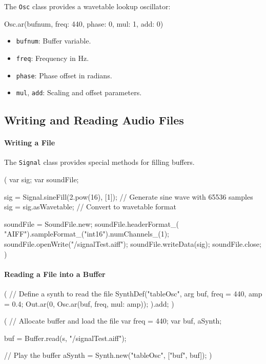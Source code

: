 The \texttt{Osc} class provides a wavetable lookup oscillator:

\begin{supercollider*}
Osc.ar(bufnum, freq: 440, phase: 0, mul: 1, add: 0)
\end{supercollider*}

\begin{itemize}
    \item \texttt{bufnum}: Buffer variable.
    \item \texttt{freq}: Frequency in Hz.
    \item \texttt{phase}: Phase offset in radians.
    \item \texttt{mul}, \texttt{add}: Scaling and offset parameters.
\end{itemize}

\subsection{Writing and Reading Audio Files}

\paragraph{Writing a File}

The \texttt{Signal} class provides special methods for filling buffers.

\begin{supercollider*}
(
var sig;
var soundFile;

sig = Signal.sineFill(2.pow(16), [1]); // Generate sine wave with 65536 samples
sig = sig.asWavetable; // Convert to wavetable format

soundFile = SoundFile.new;
soundFile.headerFormat_(
    "AIFF").sampleFormat_("int16").numChannels_(1);
soundFile.openWrite("/signalTest.aiff");
soundFile.writeData(sig);
soundFile.close;
)
\end{supercollider*}

\paragraph{Reading a File into a Buffer}

\begin{supercollider*}
(
// Define a synth to read the file
SynthDef("tableOsc", { arg buf, freq = 440, amp = 0.4; 
    Out.ar(0, Osc.ar(buf, freq, mul: amp));
}).add;
)

(
// Allocate buffer and load the file
var freq = 440;
var buf, aSynth;

buf = Buffer.read(s, "/signalTest.aiff");

// Play the buffer
aSynth = Synth.new("tableOsc", ["buf", buf]);
)
\end{supercollider*}

